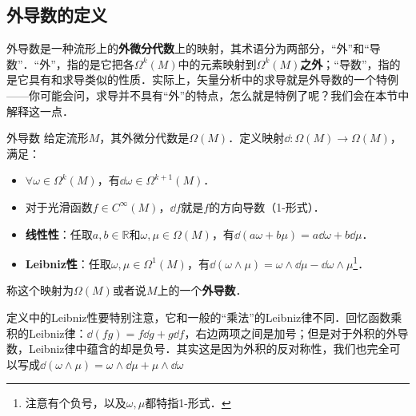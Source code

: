 

\subsection{外导数的定义}

外导数是一种流形上的\textbf{外微分代数}上的映射，其术语分为两部分，“外”和“导数”．“外”，指的是它把各$\Omega^k(M)$中的元素映射到$\Omega^k(M)$\textbf{之外}；“导数”，指的是它具有和求导类似的性质．实际上，矢量分析中的求导就是外导数的一个特例——你可能会问，求导并不具有“外”的特点，怎么就是特例了呢？我们会在本节中解释这一点．

\begin{definition}{外导数}
给定流形$M$，其外微分代数是$\Omega (M)$．定义映射$\dd:\Omega (M)\rightarrow\Omega (M)$，满足：
\begin{itemize}
\item $\forall \omega\in\Omega^k(M)$，有$\dd \omega\in\Omega^{k+1}(M)$．
\item 对于光滑函数$f\in C^\infty(M)$，$\dd f$就是$f$的方向导数（1-形式）．
\item \textbf{线性性}：任取$a, b\in \mathbb{R}$和$\omega, \mu\in\Omega(M)$，有$\dd(a\omega+b\mu)=a\dd\omega+b\dd\mu$．
\item \textbf{Leibniz性}：任取$\omega, \mu\in\Omega^1(M)$，有$\dd(\omega\wedge\mu)=\omega\wedge\dd\mu-\dd\omega\wedge\mu$\footnote{注意有个负号，以及$\omega, \mu$都特指1-形式．}．
\end{itemize}
称这个映射为$\Omega (M)$或者说$M$上的一个\textbf{外导数}．
\end{definition}

定义中的Leibniz性要特别注意，它和一般的“乘法”的Leibniz律不同．回忆函数乘积的Leibniz律：$\dd(fg)=f\dd g+g\dd f$，右边两项之间是加号；但是对于外积的外导数，Leibniz律中蕴含的却是负号．其实这是因为外积的反对称性，我们也完全可以写成$\dd(\omega\wedge\mu)=\omega\wedge\dd\mu+\mu\wedge\dd\omega$






